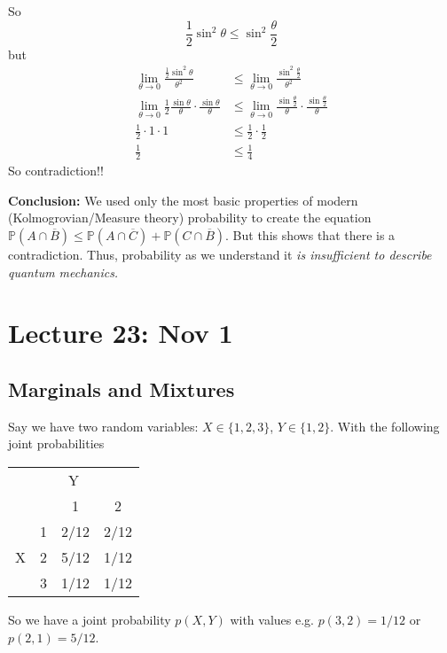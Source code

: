\documentclass[12pt]{article}
\renewcommand{\P}{\mathbb{P}}
\begin{document}
        So 
        \[\frac{1}{2}\sin^2 \theta \leq \sin^2 \frac{\theta}{2}\]
        but 
        \begin{align*}
            \lim_{\theta \to 0} \frac{\frac{1}{2}\sin^2\theta}{\theta^2} &\leq \lim_{\theta\to 0} \frac{\sin^2\frac{\theta}{2}}{\theta^2}\\
            \lim_{\theta \to 0} \frac{1}{2} \frac{\sin \theta}{\theta} \cdot \frac{\sin \theta}{\theta} &\leq \lim_{\theta \to 0} \frac{\sin \frac{\theta}{2}}{\theta} \cdot \frac{\sin \frac{\theta}{2}}{\theta}\\
            \frac{1}{2}\cdot 1\cdot 1 &\leq \frac{1}{2} \cdot \frac{1}{2}\\
            \frac{1}{2} &\leq \frac{1}{4}
        \end{align*}
        So contradiction!! 

        \textbf{Conclusion:} We used only the most basic properties of modern (Kolmogrovian/Measure theory) probability to create the equation $\P(A \cap \overline B) \leq \P(A \cap \overline C) + \P(C \cap \overline B)$. But this shows that there is a contradiction. Thus, probability as we understand it \emph{is insufficient to describe quantum mechanics.}

\section*{Lecture 23: Nov 1}
    \subsection*{Marginals and Mixtures}
        Say we have two random variables: $X \in \{1, 2, 3\}$, $Y \in \{1, 2\}$. With the following joint probabilities 
        
        \begin{center}
            \begin{tabular*}{1.5 in}{c c| c| c|}
            \multicolumn{4}{c}{Y}\\
                & & 1 & 2\\
              \hline
                & 1 & 2/12 & 2/12\\
              X & 2 & 5/12 & 1/12\\
                & 3 & 1/12 & 1/12                
          \end{tabular*}
        \end{center}

        So we have a joint probability $p(X, Y)$ with values e.g. $p(3, 2) = 1/12$ or $p(2, 1) = 5/12$. 
\end{document}
